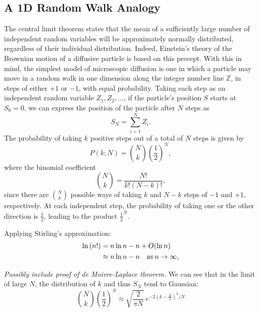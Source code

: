   \subsection{A 1D Random Walk Analogy}
  The central limit theorem states that the mean of a sufficiently large number of independent random variables will be approximately normally distributed, regardless of their individual distribution. Indeed, Einstein's theory of the Brownian motion of a diffusive particle is based on this precept. With this in mind, the simplest model of microscopic diffusion is one in which a particle may move in a random walk in one dimension along the integer number line $\mathbb{Z}$, in steps of either $+1$ or $-1$, with equal probability. Taking each step as an independent random variable $Z_1, Z_2,\ldots$, if the particle's position $S$ starts at $S_0 = 0$, we can express the position of the particle after $N$ steps as
  \begin{equation}
    S_N = \sum\limits_{i=1}^N Z_i .
  \end{equation}
  The probability of taking $k$ positive steps out of a total of $N$ steps is given by
  \begin{equation}
    P(k;N) = \binom{N}{k}\left(\frac{1}{2} \right)^N,
  \end{equation}
  where the binomial coefficient
  \begin{equation}
    \label{eq:registration:binomial-coefficient}
     \binom{N}{k} = \frac{N!}{k!(N-k)!},
  \end{equation}
  since there are $\binom{N}{k}$ possible ways of taking $k$ and $N - k$ steps of $-1$ and $+1$, respectively. At each independent step, the probability of taking one or the other direction is $\frac{1}{2}$, leading to the product $\frac{1}{2}^N$.
  
  Applying Stirling's approximation:
  \begin{align}
    \label{eq:registration:stirling}
    \ln \left( n! \right) &= n\ln n - n + O(\ln n) \notag \\
           &\approx n\ln n - n \quad \text{as}\: n \to \infty,
  \end{align}
  
  \emph{Possibly include proof of de Moivre-Laplace theorem.}
  We can see that in the limit of large $N$, the distribution of $k$ and thus $S_N$ tend to Gaussian:
  \begin{equation}
    \label{eq:registration:gaussian-approximation}
    \binom{N}{k}\left(\frac{1}{2}\right)^N \approx \sqrt{\frac{2}{\pi N}} \
      e^{-2(k - \frac{N}{2})^2/N}
  \end{equation}
  
